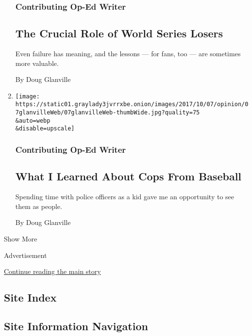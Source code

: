 \begin{enumerate}
{  \subsubsection{Contributing Op-Ed
  Writer}\label{contributing-op-ed-writer}}

  \hypertarget{the-crucial-role-of-world-series-losers}{%
  \subsection{The Crucial Role of World Series
  Losers}\label{the-crucial-role-of-world-series-losers}}

  Even failure has meaning, and the lessons --- for fans, too --- are
  sometimes more valuable.

  By Doug Glanville
\item
  \href{/2017/10/06/opinion/police-baseball.html}{}

  \texttt{[image: https://static01.graylady3jvrrxbe.onion/images/2017/10/07/opinion/07glanvilleWeb/07glanvilleWeb-thumbWide.jpg?quality=75\\\&auto=webp\\\&disable=upscale]}

  \hypertarget{contributing-op-ed-writer-1}{%
  \subsubsection{Contributing Op-Ed
  Writer}\label{contributing-op-ed-writer-1}}

  \hypertarget{what-i-learned-about-cops-from-baseball}{%
  \subsection{What I Learned About Cops From
  Baseball}\label{what-i-learned-about-cops-from-baseball}}

  Spending time with police officers as a kid gave me an opportunity to
  see them as people.

  By Doug Glanville
\end{enumerate}

Show More

Advertisement

\protect\hyperlink{after-mid2}{Continue reading the main story}

\hypertarget{site-index}{%
\subsection{Site Index}\label{site-index}}

\hypertarget{site-information-navigation}{%
\subsection{Site Information
Navigation}\label{site-information-navigation}}


